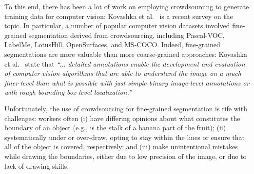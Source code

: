 \documentclass[letterpaper]{article} %
\begin{document}
\par To this end, there has been a lot of work on 
employing crowdsourcing to generate training data for 
computer vision; Kovashka et al.~
is a recent survey 
on the topic.
In particular, a number of popular computer vision datasets
involved fine-grained 
segmentation derived from crowdsourcing, 
including Pascal-VOC, LabelMe, LotusHill, OpenSurfaces, and MS-COCO.
Indeed, fine-grained segmentations are more
valuable than more coarse-grained approaches: Kovashka et al.~\cite{AdrianaKovashka2016} 
state that {\em ``... detailed annotations 
enable the development and evaluation
of computer vision algorithms 
that are able to understand the image
on a much finer level than what is 
possible with just simple binary
image-level annotations or with rough bounding box-level localization.''}

\par Unfortunately, the use of crowdsourcing
for fine-grained segmentation is rife with challenges:
workers often (i) have differing opinions about what
constitutes the boundary of an object (e.g.,
is the stalk of a banana part of the fruit);
(ii) systematically under or over-draw, opting to
stay within the lines or ensure that all of the object
is covered, respectively; and 
(iii) make unintentional mistakes while 
drawing the boundaries, either due to low precision
of the image, or due to lack of drawing skills. 


\end{document}
